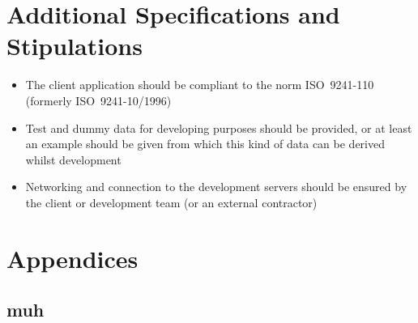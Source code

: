 \documentclass[11pt,a4paper,oneside,svgnames]{report}
\begin{document}
\chapter{Additional Specifications and Stipulations}
\begin{itemize}
	\item The client application should be compliant to the norm ISO~9241-110 (formerly ISO~9241-10/1996)
	\item Test and dummy data for developing purposes should be provided, or at least an example should be given from which this kind of data can be derived whilst development
	\item Networking and connection to the development servers should be ensured by the client or development team (or an external contractor)
\end{itemize}

\chapter{Appendices}
\section{muh}

\printglossaries
\end{document}
